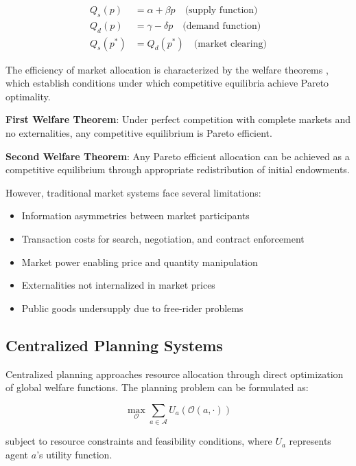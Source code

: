 \documentclass[12pt,a4paper]{article}
\begin{document}
\begin{align}
Q_s(p) &= \alpha + \beta p \quad \text{(supply function)} \\
Q_d(p) &= \gamma - \delta p \quad \text{(demand function)} \\
Q_s(p^*) &= Q_d(p^*) \quad \text{(market clearing)}
\end{align}

The efficiency of market allocation is characterized by the welfare theorems \cite{samuelson1947,debreu1959}, which establish conditions under which competitive equilibria achieve Pareto optimality.

\textbf{First Welfare Theorem}: Under perfect competition with complete markets and no externalities, any competitive equilibrium is Pareto efficient.

\textbf{Second Welfare Theorem}: Any Pareto efficient allocation can be achieved as a competitive equilibrium through appropriate redistribution of initial endowments.

However, traditional market systems face several limitations:
\begin{itemize}
\item Information asymmetries between market participants
\item Transaction costs for search, negotiation, and contract enforcement
\item Market power enabling price and quantity manipulation
\item Externalities not internalized in market prices
\item Public goods undersupply due to free-rider problems
\end{itemize}

\subsection{Centralized Planning Systems}

Centralized planning approaches resource allocation through direct optimization of global welfare functions. The planning problem can be formulated as:

\begin{equation}
\max_{\mathcal{O}} \sum_{a \in \mathcal{A}} U_a(\mathcal{O}(a,\cdot))
\end{equation}

subject to resource constraints and feasibility conditions, where $U_a$ represents agent $a$'s utility function.
\end{document}
